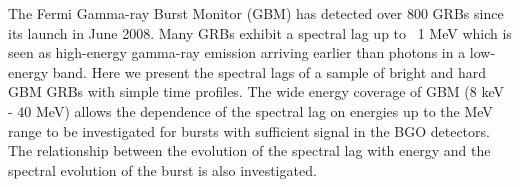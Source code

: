 


\bigskip



\bigskip

\noindent The Fermi Gamma-ray Burst Monitor (GBM) has detected over 800 GRBs since its launch in June 2008. Many GRBs exhibit a spectral lag up to ~1 MeV which is seen as high-energy gamma-ray emission arriving earlier than photons in a low-energy band. Here we present the spectral lags of a sample of bright and hard GBM GRBs with simple time profiles. The wide energy coverage of GBM (8 keV - 40 MeV) allows the dependence of the spectral lag on energies up to the MeV range to be investigated for bursts with sufficient signal in the BGO detectors. The relationship between the evolution of the spectral lag with energy and the spectral evolution of the burst is also investigated.
